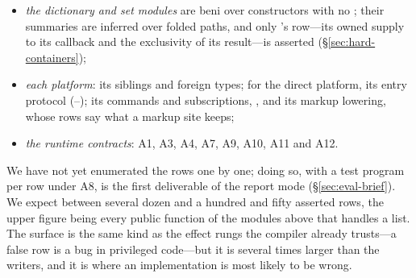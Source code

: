 \begin{itemize}
exclusive, when every mapping, injection and conversion function the schema holds returns owned, and
otherwise carries what those functions return; a printer only reads---unless it hands a list's array to
the host as it is, in which case it escapes it;
\item \emph{the dictionary and set modules} are beni over constructors with no ; their summaries
are inferred over folded paths, and only 's row---its owned supply to its callback and the
exclusivity of its result---is asserted (\S\ref{sec:hard-containers});
\item \emph{each platform}: its  siblings and foreign types; for the direct platform, its
entry protocol (--); its commands and subscriptions, , and its markup lowering, whose rows
say what a markup site keeps;
\item \emph{the runtime contracts}: A1, A3, A4, A7, A9, A10, A11 and A12.
\end{itemize}
We have not yet enumerated the rows one by one; doing so, with a test program per row under A8, is the
first deliverable of the report mode (\S\ref{sec:eval-brief}). We expect between several dozen and a
hundred and fifty asserted rows, the upper figure being every public function of the modules above that
handles a list. The surface is the same kind as the effect rungs the compiler already trusts---a false
row is a bug in privileged code---but it is several times larger than the writers, and it is where an
implementation is most likely to be wrong.

